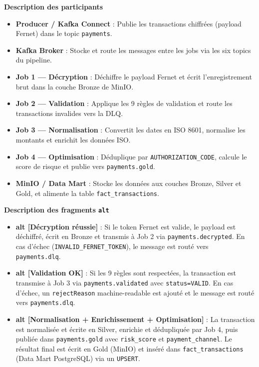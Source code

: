 \vspace{0.3cm}
\textbf{Description des participants}

\begin{itemize}[leftmargin=1.5cm]
    \item \textbf{Producer / Kafka Connect} : Publie les transactions chiffrées (payload Fernet) dans le topic \texttt{payments}.
    \item \textbf{Kafka Broker} : Stocke et route les messages entre les jobs via les six topics du pipeline.
    \item \textbf{Job 1 --- Décryption} : Déchiffre le payload Fernet et écrit l'enregistrement brut dans la couche Bronze de MinIO.
    \item \textbf{Job 2 --- Validation} : Applique les 9 règles de validation et route les transactions invalides vers la DLQ.
    \item \textbf{Job 3 --- Normalisation} : Convertit les dates en ISO 8601, normalise les montants et enrichit les données ISO.
    \item \textbf{Job 4 --- Optimisation} : Déduplique par \texttt{AUTHORIZATION\_CODE}, calcule le score de risque et publie vers \texttt{payments.gold}.
    \item \textbf{MinIO / Data Mart} : Stocke les données aux couches Bronze, Silver et Gold, et alimente la table \texttt{fact\_transactions}.
\end{itemize}

\vspace{0.3cm}
\textbf{Description des fragments \texttt{alt}}

\begin{itemize}[leftmargin=1.5cm]
    \item \textbf{alt [Décryption réussie]} : Si le token Fernet est valide, le payload est déchiffré, écrit en Bronze et transmis à Job 2 via \texttt{payments.decrypted}. En cas d'échec (\texttt{INVALID\_FERNET\_TOKEN}), le message est routé vers \texttt{payments.dlq}.
    \item \textbf{alt [Validation OK]} : Si les 9 règles sont respectées, la transaction est transmise à Job 3 via \texttt{payments.validated} avec \texttt{status=VALID}. En cas d'échec, un \texttt{rejectReason} machine-readable est ajouté et le message est routé vers \texttt{payments.dlq}.
    \item \textbf{alt [Normalisation + Enrichissement + Optimisation]} : La transaction est normalisée et écrite en Silver, enrichie et dédupliquée par Job 4, puis publiée dans \texttt{payments.gold} avec \texttt{risk\_score} et \texttt{payment\_channel}. Le résultat final est écrit en Gold (MinIO) et inséré dans \texttt{fact\_transactions} (Data Mart PostgreSQL) via un \texttt{UPSERT}.
\end{itemize}

